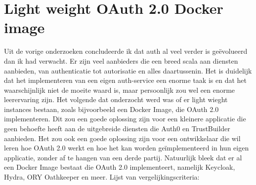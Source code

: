 \section{Light weight OAuth 2.0 Docker image}%
\label{sec:light-weight-oauth-2.0-docker-image}
Uit de vorige onderzoeken concludeerde ik dat auth al veel verder is geëvolueerd dan ik had verwacht. Er zijn veel aanbieders die een breed scala aan diensten aanbieden, van authenticatie tot autorisatie en alles daartussenin. Het is duidelijk dat het implementeren van een eigen auth-service een enorme taak is en dat het waarschijnlijk niet de moeite waard is, maar persoonlijk zou wel een enorme leerervaring zijn.
\newline
\newline
Het volgende dat onderzocht werd was of er light wieght instances bestaan, zoals bijvoorbeeld een Docker Image, die OAuth 2.0 implementeren. Dit zou een goede oplossing zijn voor een kleinere applicatie die geen behoefte heeft aan de uitgebreide diensten die Auth0 en TrustBuilder aanbieden. Het zou ook een goede oplossing zijn voor een ontwikkelaar die wil leren hoe OAuth 2.0 werkt en hoe het kan worden geïmplementeerd in hun eigen applicatie, zonder af te hangen van een derde partij.
\newline
\newline
Natuurlijk bleek dat er al een Docker Image bestaat die OAuth 2.0 implementeert, namelijk Keycloak, Hydra, ORY Oathkeeper en meer.
\newline
\newline
Lijst van vergelijkingscriteria:

